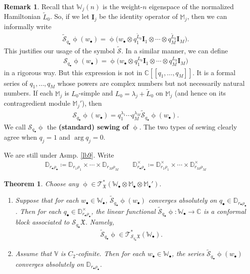 \documentclass[11pt,b5paper,notitlepage]{article}
\theoremstyle{definition}
\newtheorem{rem}[df]{Remark}
\theoremstyle{plain}
\newtheorem{thm}[df]{Theorem}
\newcommand{\fk}{\mathfrak}
\newcommand{\mc}{\mathcal}
\newcommand{\wtd}{\widetilde}
\newcommand{\scr}{\mathscr}
\newcommand{\blt}{\bullet}
\newcommand{\Vbb}{\mathbb V}
\newcommand{\Wbb}{\mathbb W}
\newcommand{\Mbb}{\mathbb M}
\newcommand{\Cbb}{\mathbb C}
\newcommand{\Dbb}{\mathbb D}
\newcommand{\Ibf}{\mathbf I}
\newcommand{\Std}{\widetilde{\mc S}}
\numberwithin{equation}{section}
\begin{document}
\begin{rem}
Recall that $\Wbb_j(n)$ is the weight-$n$ eigenspace of the normalized Hamiltonian $\wtd L_0$. So, if we let $\Ibf_j$ be the identity operator of $\Mbb_j$, then we can informally write
\begin{align*}
\Std_{q_\blt}\upphi(w_\blt)=\upphi\big(w_\blt\otimes q_1^{\wtd L_0}\Ibf_1\otimes\cdots\otimes q_M^{\wtd L_0}\Ibf_M\big).
\end{align*}
This justifies our usage of the symbol $\Std$. In a similar manner, we can define
\begin{align}
\mc S_{q_\blt}\upphi(w_\blt)=\upphi\big(w_\blt\otimes q_1^{L_0}\Ibf_1\otimes\cdots\otimes q_M^{L_0}\Ibf_M\big) \label{eq19}
\end{align}
in a rigorous way. But this expression is not in $\Cbb[[q_1,\dots,q_M]]$. It is a formal series of $q_1,\dots,q_M$ whose powers are complex numbers but not necessarily natural numbers. If each $\Mbb_j$ is $L_0$-simple and $L_0=\lambda_j+\wtd L_0$ on $\Mbb_j$ (and hence on its contragredient module $\Mbb_j'$), then
\begin{align*}
\mc S_{q_\blt}\upphi(w_\blt)=q_1^{\lambda_1}\cdots q_M^{\lambda_M}\Std_{q_\blt}\upphi(w_\blt).
\end{align*}
We call $\mc S_{q_\blt}\upphi$ the \textbf{(standard) sewing of $\upphi$}. The two types of sewing clearly agree when $q_j=1$ and $\arg q_j=0$. 
\end{rem}


We are still under Asmp. \ref{lb9}. Write \index{D@$\Dbb_{r_\blt\rho_\blt},\Dbb_{r_\blt\rho_\blt}^\times$}
\begin{align*}
\Dbb_{r_\blt\rho_\blt}\coloneq \Dbb_{r_1\rho_1}\times\cdots\times \Dbb_{r_M\rho_M}\qquad \Dbb_{r_\blt\rho_\blt}^\times\coloneq \Dbb_{r_1\rho_1}^\times\times\cdots\times \Dbb_{r_M\rho_M}^\times
\end{align*}


\begin{thm}\label{lb12}
Choose any $\upphi\in\scr T_{\fk X}^*(\Wbb_\blt\otimes\Mbb_\blt\otimes\Mbb_\blt')$.
\begin{enumerate}
\item Suppose that for each $w_\blt\in\Wbb_\blt$, $\Std_{q_\blt}\upphi(w_\blt)$ converges absolutely on $q_\blt\in \Dbb_{r_\blt\rho_\blt}$. Then for each $q_\blt\in\Dbb_{r_\blt\rho_\blt}^\times$, the linear functional $\Std_{q_\blt}\upphi:\Wbb_\blt\rightarrow\Cbb$ is a conformal block associated to $\mc S_{q_\blt}\fk X$. Namely,
\begin{align*}
\Std_{q_\blt}\upphi\in \scr T_{\mc S_{q_\blt}\fk X}^*(\Wbb_\blt).
\end{align*}
\item Assume that $\Vbb$ is $C_2$-cofinite. Then for each $w_\blt\in\Wbb_\blt$, the series $\Std_{q_\blt}\upphi(w_\blt)$ converges absolutely on $\Dbb_{r_\blt\rho_\blt}$.
\end{enumerate}
\end{thm}
\end{document}
